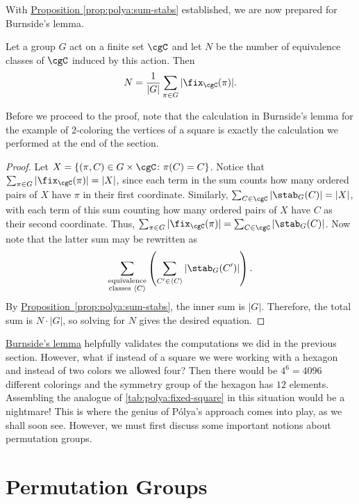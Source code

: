 With \hyperref[prop:polya:sum-stabs]{Proposition
  \ref*{prop:polya:sum-stabs}} established, we are now prepared for
Burnside's lemma.

\begin{lemma}\label{lem:polya:burnside}
  Let a group $G$ act on a finite set $\cgC$ and let $N$ be the
  number of equivalence classes of $\cgC$ induced by this
  action. Then
  \[N = \frac{1}{|G|} \sum_{\pi\in G} |\fix_\cgC(\pi)|.\]
\end{lemma}

Before we proceed to the proof, note that the calculation in
Burnside's lemma for the example of $2$-coloring the vertices of a
square is exactly the calculation we performed at the end of the
section.

\begin{proof}
  Let $X=\{(\pi,C)\in G\times \cgC\colon \pi(C) = C\}$. Notice that
  $\sum_{\pi \in G} |\fix_\cgC(\pi)| = |X|$, since each term in the
  sum counts how many ordered pairs of $X$ have $\pi$ in their first
  coordinate. Similarly, $\sum_{C\in \cgC} |\stab_G(C)| = |X|$, with
  each term of this sum counting how many ordered pairs of $X$ have
  $C$ as their second coordinate. Thus, $\sum_{\pi \in G}
  |\fix_\cgC(\pi)|=\sum_{C\in \cgC} |\stab_G(C)|$. Now note that the
  latter sum may be rewritten
  as \[\sum_{\substack{\text{equivalence}\\\text{classes } \langle
      C\rangle}}\left( \sum_{C'\in\langle C\rangle}
    |\stab_G(C')|\right).\] By
  \hyperref[prop:polya:sum-stabs]{Proposition~\ref*{prop:polya:sum-stabs}},
  the inner sum is $|G|$. Therefore, the total sum is $N\cdot |G|$, so
  solving for $N$ gives the desired equation.
\end{proof}

\hyperref[lem:polya:burnside]{Burnside's lemma} helpfully validates
the computations we did in the previous section. However, what if
instead of a square we were working with a hexagon and instead of two
colors we allowed four? Then there would be $4^6=4096$ different
colorings and the symmetry group of the hexagon has $12$
elements. Assembling the analogue of \autoref{tab:polya:fixed-square}
in this situation would be a nightmare! This is where the genius of
P\'olya's approach comes into play, as we shall soon see. However, we
must first discuss some important notions about permutation groups.

\section{Permutation Groups}\label{s:polya:perm-groups}

